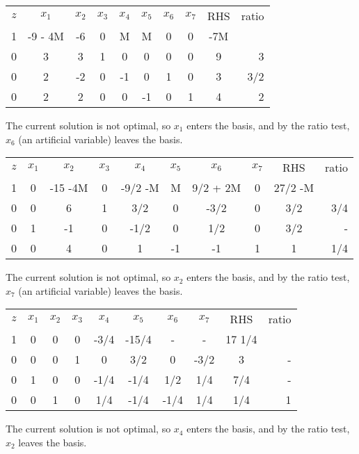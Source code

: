 \begin{center} \begin{tabular} {|c|c|c|c|c|c|c|c||c| r} \cline{1-9}
$z$	& $x_1$	  & $x_2$  & $x_3$	& $x_4$	& $x_5$	& $x_6$	& $x_7$	& RHS &	ratio \\ \cline{1-9}
1	& -9 - 4M & -6     &	 0 &	  M &	  M &	  0 &	  0 & -7M &	      \\
0	&	  3   &	     3 &	 1 &	  0 &	  0 &	  0 &	  0 &	9 &	3     \\
0	&	  2   &	    -2 &	 0 &	 -1 &	  0 &	  1 &	  0 &	3 &	3/2   \\
0	&	  2   &	     2 &	 0 &	  0 &	 -1 &	  0 &	  1 &	4 &	2     \\
\cline{1-9}
\end{tabular} \end{center}
\noindent The current solution is not optimal, so $x_1$ enters the basis, and by the ratio test, $x_6$ (an artificial variable) leaves the basis.

\begin{center} \begin{tabular} {|c|c|c|c|c|c|c|c||c| r} \cline{1-9}
$z$	&   $x_1$ & $x_2$   & $x_3$	& $x_4$	& $x_5$	& $x_6$	   & $x_7$	& RHS      & ratio \\
\cline{1-9}
1	&     0   & -15 -4M &	 0 & -9/2 -M &	  M & 9/2 + 2M &	  0 &  27/2 -M &    	\\
0	&	  0   &	     6  &	 1 &	 3/2 &	  0 &	    -3/2 &	  0 &	3/2    & 3/4     \\
0	&	  1   &	    -1  &	 0 &	-1/2 &	  0 &	   1/2 &	  0 &	3/2    & -  	\\
0	&	  0   &	     4  &	 0 &	   1 &	 -1 &	     -1 &	  1 &	  1    & 1/4        	\\ \cline{1-9}
\end{tabular} \end{center}
\noindent The current solution is not optimal, so $x_2$ enters the basis, and by the ratio test, $x_7$ (an artificial variable) leaves the basis.

\begin{center} \begin{tabular} {|c|c|c|c|c|c|c|c||c|r} \cline{1-9}
$z$	&   $x_1$ & $x_2$ & $x_3$ & $x_4$	& $x_5$	& $x_6$	   & $x_7$	& RHS     &	ratio \\
\cline{1-9}
1	&     0   &     0 &	 0    & -3/4    & -15/4 &        - &	  - &  17 1/4 &	   \\
0	&	  0   &	    0 &	 1    &	   0    &	3/2 &	     0 &   -3/2 &	  3   &	-  \\
0	&	  1   &	    0 &	 0    &	-1/4    &  -1/4 &	   1/2 &	1/4 &	  7/4 &	-  	\\
0	&	  0   &	    1 &	 0    &	 1/4    &  -1/4 &	  -1/4 &	1/4 &	  1/4 & 1   \\
\cline{1-9}
\end{tabular} \end{center}
\noindent The current solution is not optimal, so $x_4$ enters the basis, and by the ratio test, $x_2$ leaves the basis.

